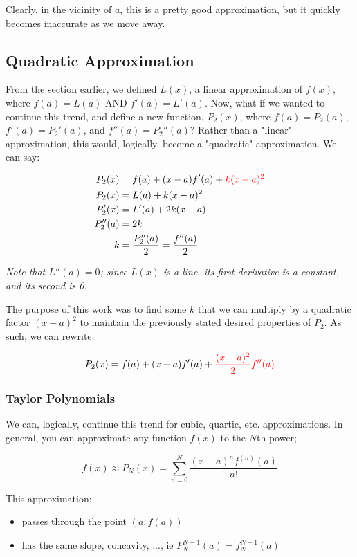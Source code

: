 \documentclass[12pt]{article}
\begin{document}
Clearly, in the vicinity of $a$, this is a pretty good approximation, but it quickly becomes inaccurate as we move away.

\subsection{Quadratic Approximation}
From the section earlier, we defined $L(x)$, a linear approximation of $f(x)$, where $f(a) = L(a)$ AND $f'(a) = L'(a)$. Now, what if we wanted to continue this trend, and define a new function, $P_2(x)$, where $f(a) = P_2(a)$, $f'(a) = P_2'(a)$, and $f''(a) = P_2''(a)$? Rather than a "linear" approximation, this would, logically, become a "quadratic" approximation. We can say:

\begin{equation}
    \begin{split}
    P_2(x) &= f(a) + (x-a)f'(a) + \textcolor{red}{k(x-a)^2}\\
    P_2(x) &= L(a) + k(x-a)^2\\
    P_2'(x) &= L'(a) + 2k(x-a)\\
    P_2''(a) &= 2k\\
    k &= \frac{P_2''(a)}{2} = \frac{f''(a)}{2}
    \end{split}
\end{equation}

\textit{Note that $L''(a) = 0$; since $L(x)$ is a line, its first derivative is a constant, and its second is 0.}

The purpose of this work was to find some $k$ that we can multiply by a quadratic factor $(x-a)^2$ to maintain the previously stated desired properties of $P_2$. As such, we can rewrite:

$$P_2(x) = f(a) + (x-a)f'(a) + \textcolor{red}{\frac{(x-a)^2}{2}f''(a)}$$

\subsubsection{Taylor Polynomials}
We can, logically, continue this trend for cubic, quartic, etc. approximations. In general, you can approximate any function $f(x)$ to the $N$th power;

$$f(x) \approx P_N(x) = \sum_{n=0}^{N} \frac{(x-a)^n f^{(n)}(a)}{n!}$$

This approximation:
\begin{itemize}
    \item passes through the point $(a,f(a))$
    \item has the same slope, concavity, ..., ie $P_N^{N-1}(a) = f_N^{N-1}(a)$
\end{itemize}
\end{document}
